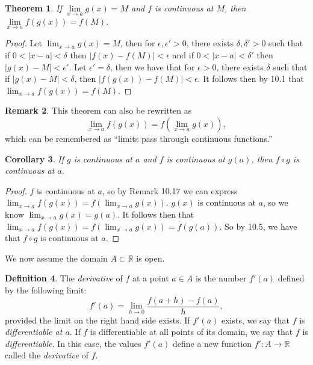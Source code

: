 \documentclass[12pt]{article}
\newcommand{\bbR}{\mathbb{R}}
\providecommand{\abs}[1]{\lvert #1 \rvert}
\providecommand{\sarr}{\rightarrow}
\providecommand{\arr}{\longrightarrow}
\renewcommand{\_}[1]{\underline{ #1 }}
\newtheorem{theorem}{Theorem}[section]
\newtheorem{corollary}[theorem]{Corollary}
\theoremstyle{definition}
\newtheorem{definition}[theorem]{Definition}
\newtheorem{remark}[theorem]{Remark}
\numberwithin{equation}{subsection}
\begin{document}
\begin{theorem}

If $\lim\limits_{x\to a}g(x)=M$ and $f$ is continuous at $M$, then
$\lim\limits_{x\to a}f(g(x))=f(M)$. 
\end{theorem}

\begin{proof}
Let $\lim_{x \to a}g(x) = M$, then for $\epsilon, \epsilon' > 0$, there exists $\delta, \delta' > 0$ such that if $0 < \abs{x - a} < \delta$  then $\abs{f(x) - f(M)} < \epsilon$ and if $0 < \abs{x-a} < \delta'$ then $\abs{g(x) - M} < \epsilon'$. Let $\epsilon' = \delta$, then we have that for $\epsilon > 0$, there exists $\delta$ such that if $\abs{g(x) - M} < \delta$, then $\abs{f(g(x)) - f(M)} < \epsilon$. It follows then by 10.1 that $\lim_{x \to a} f(g(x)) = f(M)$.
\end{proof}

\begin{remark}
This theorem can also be rewritten as
$$\lim\limits_{x\to a}f(g(x))=f\left(\lim\limits_{x\to a}g(x)\right),$$
which can be remembered as ``limits pass through continuous functions.''
\end{remark}
\begin{corollary}If $g$ is continuous at $a$ and $f$ is continuous at $g(a)$, then $f\circ g$ is continuous at $a$.
\end{corollary}

\begin{proof}
$f$ is continuous at $a$, so by Remark 10.17 we can express $\lim_{x \to a}f(g(x)) = f(\lim_{x \to a}g(x))$. $g(x)$ is continuous at $a$, so we know $\lim_{x \to a}g(x) = g(a)$. It follows then that $\lim_{x \to a}f(g(x)) = f(\lim_{x \to a}g(x)) = f(g(a))$. So by 10.5, we have that $f \circ g$ is continuous at $a$.
\end{proof}


\medskip



We now assume the domain $A \subset \bbR$ is open.
\begin{definition}
The \emph{derivative} of $f$ at a point $a \in A$ is the number $f'(a)$ defined by the following limit:
\[
f'(a) = \lim_{h \sarr 0} \frac{f(a + h) - f(a)}{h},
\]
provided the limit on the right hand side exists.
If $f'(a)$ exists, we say that $f$ is \emph{differentiable at $a$}.  If $f$ is differentiable at all points of its domain, we say that $f$ is \emph{differentiable}.  In this case, the values $f'(a)$ define a new function $f' \colon A \arr \bbR$ called the \emph{derivative} of $f$.
\end{definition}
\end{document}
